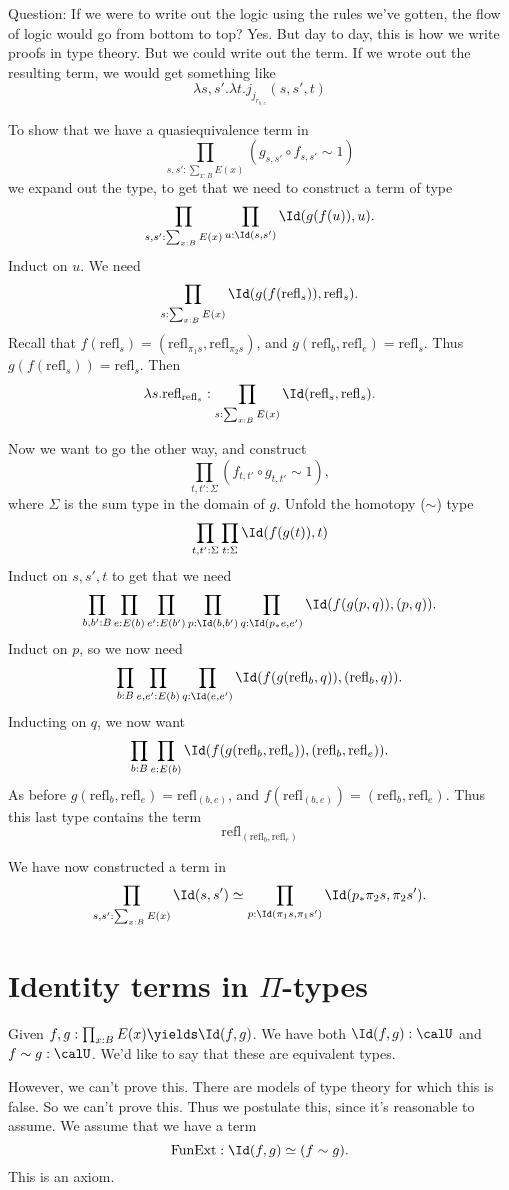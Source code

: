 \documentclass{article}
\newcommand\refl{\mathrm{refl}}
\newcommand\FunExt{\mathrm{FunExt}}
\begin{document}
Question: If we were to write out the logic using the rules we've 
gotten, the flow of logic would go from bottom to top?
Yes. But day to day, this is how we write proofs in type theory.
But we could write out the term. 
If we wrote out the resulting term, we would get something 
like
\[ \lambda s,s'. \lambda t. j_{j_{r_{b,e}}}(s,s',t) \]

To show that we have a quasiequivalence term in 
\[
    \prod_{s,s':\sum_{x:B}E(x)} (g_{s,s'}\circ f_{s,s'}\sim 1)
\]
we expand out the type, to get that we need to construct 
a term of type 
\[
    \prod_{s,s':\sum_{x:B}E(x)} \prod_{u:\Id(s,s')}
    \Id(g(f(u)),u).
\]
Induct on $u$. We need
\[
    \prod_{s:\sum_{x:B}E(x)}\Id(g(f(\refl_s)),\refl_s).
\]
Recall that $f(\refl_s) = (\refl_{\pi_1s},\refl_{\pi_2s})$,
and $g(\refl_b,\refl_e)=\refl_s$. Thus 
$g(f(\refl_s)) = \refl_s$. Then 
\[ 
    \lambda s.
    \refl_{\refl_s}
    :
    \prod_{s:\sum_{x:B}E(x)} \Id(\refl_s,\refl_s).
\]

Now we want to go the other way, and construct 
\[\prod_{t,t':\Sigma} (f_{t,t'}\circ g_{t,t'}\sim 1),\]
where $\Sigma$ is the sum type in the domain of $g$.
Unfold the homotopy ($\sim$) type
\[\prod_{t,t':\Sigma} \prod_{t:\Sigma}
\Id(f(g(t)),t)\]
Induct on $s,s',t$ to get that we need
\[
    \prod_{b,b':B}
    \prod_{e:E(b)}
    \prod_{e':E(b')}
    \prod_{p:\Id(b,b')}
    \prod_{q:\Id(p_*e,e')}
    \Id(f(g(p,q)),(p,q)).
\]
Induct on $p$, so we now need 
\[
    \prod_{b:B}
    \prod_{e,e':E(b)}
    \prod_{q:\Id(e,e')}
    \Id(f(g(\refl_b,q)),(\refl_b,q)).
\]
Inducting on $q$, we now want
\[
    \prod_{b:B}
    \prod_{e:E(b)}
    \Id(f(g(\refl_b,\refl_e)),(\refl_b,\refl_e)).
\]
As before $g(\refl_b,\refl_e)=\refl_{(b,e)}$,
and $f(\refl_{(b,e)}) = (\refl_b,\refl_e)$.
Thus this last type contains the term
\[
    \refl_{(\refl_b,\refl_e)}
\]

We have now constructed a term in 
\[
    \prod_{s,s':\sum_{x:B}E(x)}\Id(s,s')
    \simeq
    \prod_{p:\Id(\pi_1s,\pi_1s')}
    \Id(p_*\pi_2s,\pi_2s').
\]

\section{Identity terms in $\Pi$-types}

Given $f,g:\prod_{x:B} E(x)\yields \Id(f,g)$. We have 
both $\Id(f,g):\calU$ and $f\sim g:\calU$.
We'd like to say that these are equivalent types.

However, we can't prove this. There are models of type theory
for which this is false. So we can't prove this.
Thus we postulate this, since it's reasonable to assume.
We assume that we have a term 
\[\FunExt:\Id(f,g)\simeq (f\sim g).\]
This is an axiom.
\end{document}
